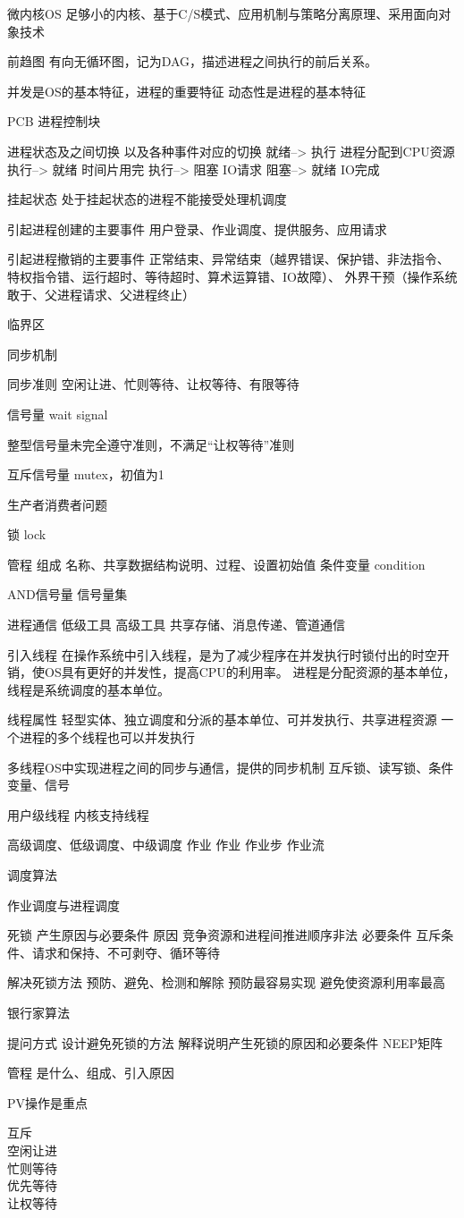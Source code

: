 微内核OS
足够小的内核、基于C/S模式、应用机制与策略分离原理、采用面向对象技术

前趋图
有向无循环图，记为DAG，描述进程之间执行的前后关系。

并发是OS的基本特征，进程的重要特征
动态性是进程的基本特征

PCB 进程控制块

进程状态及之间切换
以及各种事件对应的切换
就绪--> 执行 进程分配到CPU资源
执行--> 就绪 时间片用完
执行--> 阻塞 IO请求
阻塞--> 就绪 IO完成

挂起状态
处于挂起状态的进程不能接受处理机调度

引起进程创建的主要事件
用户登录、作业调度、提供服务、应用请求

引起进程撤销的主要事件
正常结束、异常结束（越界错误、保护错、非法指令、
特权指令错、运行超时、等待超时、算术运算错、IO故障）、
外界干预（操作系统敢于、父进程请求、父进程终止）

临界区

同步机制

同步准则
空闲让进、忙则等待、让权等待、有限等待

信号量 wait signal

整型信号量未完全遵守准则，不满足“让权等待”准则

互斥信号量 mutex，初值为1 


生产者消费者问题

锁 lock

管程
组成 名称、共享数据结构说明、过程、设置初始值
条件变量 condition 

AND信号量
信号量集

进程通信
低级工具 
高级工具 共享存储、消息传递、管道通信


引入线程
在操作系统中引入线程，是为了减少程序在并发执行时锁付出的时空开销，使OS具有更好的并发性，提高CPU的利用率。
进程是分配资源的基本单位，线程是系统调度的基本单位。

线程属性
轻型实体、独立调度和分派的基本单位、可并发执行、共享进程资源
一个进程的多个线程也可以并发执行



多线程OS中实现进程之间的同步与通信，提供的同步机制
互斥锁、读写锁、条件变量、信号

用户级线程
内核支持线程

高级调度、低级调度、中级调度
作业
作业 作业步 作业流

调度算法

作业调度与进程调度

死锁
产生原因与必要条件
原因 竞争资源和进程间推进顺序非法
必要条件 互斥条件、请求和保持、不可剥夺、循环等待

解决死锁方法
预防、避免、检测和解除
预防最容易实现
避免使资源利用率最高

银行家算法


提问方式
设计避免死锁的方法
解释说明产生死锁的原因和必要条件
NEEP矩阵

管程 是什么、组成、引入原因



PV操作是重点

互斥 \\ 
空闲让进 \\
忙则等待 \\ 
优先等待 \\ 
让权等待 \\ 


